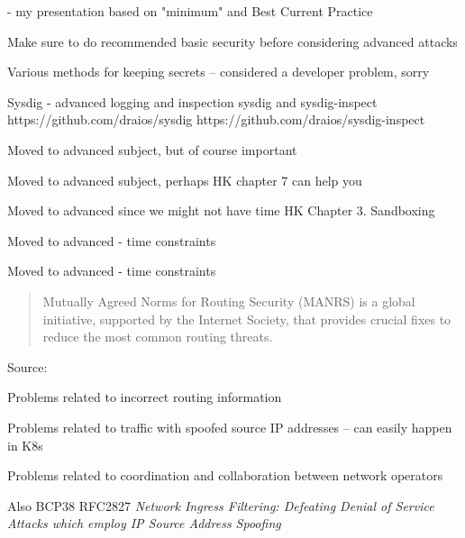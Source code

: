 \documentclass[Screen16to9,17pt]{foils}
\begin{document}
\myquestionspage


- my presentation based on "minimum" and Best Current Practice

Make sure to do recommended basic security before considering advanced attacks

Various methods for keeping secrets -- considered a developer problem, sorry


Sysdig - advanced logging and inspection
sysdig and sysdig-inspect
https://github.com/draios/sysdig
https://github.com/draios/sysdig-inspect


Moved to advanced subject, but of course important


Moved to advanced subject, perhaps HK chapter 7 can help you


Moved to advanced since we might not have time
HK Chapter 3. Sandboxing

Moved to advanced - time constraints

Moved to advanced - time constraints



\begin{quote}
  Mutually Agreed Norms for Routing Security (MANRS) is a global initiative, supported by the Internet Society, that provides crucial fixes to reduce the most common routing threats. ﻿
\end{quote}
Source: {\small{}}

\begin{list2}
\item Problems related to incorrect routing information
\item Problems related to traffic with spoofed source IP addresses -- can easily happen in K8s
\item Problems related to coordination and collaboration between network operators
\item Also BCP38 RFC2827 \emph{Network Ingress Filtering: Defeating Denial of Service Attacks
which employ IP Source Address Spoofing}
\end{list2}
\end{document}
